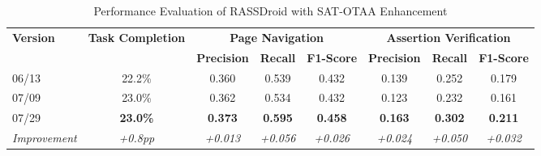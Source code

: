 
\begin{table}[htbp]
\centering
\caption{Performance Evaluation of RASSDroid with SAT-OTAA Enhancement}
\label{tab:rassdroid_performance}
\begin{tabular}{@{}lccccccc@{}}
\toprule
\multirow{2}{*}{\textbf{Version}} & \multirow{2}{*}{\textbf{Task Completion}} & \multicolumn{3}{c}{\textbf{Page Navigation}} & \multicolumn{3}{c}{\textbf{Assertion Verification}} \\
\cmidrule(lr){3-5} \cmidrule(l){6-8}
& & \textbf{Precision} & \textbf{Recall} & \textbf{F1-Score} & \textbf{Precision} & \textbf{Recall} & \textbf{F1-Score} \\
\midrule
06/13 & 22.2\% & 0.360 & 0.539 & 0.432 & 0.139 & 0.252 & 0.179 \\
07/09 & 23.0\% & 0.362 & 0.534 & 0.432 & 0.123 & 0.232 & 0.161 \\
07/29 & \textbf{23.0\%} & \textbf{0.373} & \textbf{0.595} & \textbf{0.458} & \textbf{0.163} & \textbf{0.302} & \textbf{0.211} \\
\midrule
\textit{Improvement} & \textit{+0.8pp} & \textit{+0.013} & \textit{+0.056} & \textit{+0.026} & \textit{+0.024} & \textit{+0.050} & \textit{+0.032} \\
\bottomrule
\end{tabular}
\end{table}
